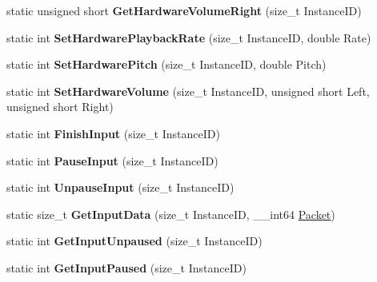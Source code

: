 \begin{DoxyCompactItemize}
\item 
\hypertarget{structmn_c_l_r_aefc279d14aae4274e6966dcf831cd2f9}{
static unsigned short {\bfseries GetHardwareVolumeRight} (size\_\-t InstanceID)}
\label{structmn_c_l_r_aefc279d14aae4274e6966dcf831cd2f9}

\item 
\hypertarget{structmn_c_l_r_a3d8c4243968b7a1a304da2836f5d11ca}{
static int {\bfseries SetHardwarePlaybackRate} (size\_\-t InstanceID, double Rate)}
\label{structmn_c_l_r_a3d8c4243968b7a1a304da2836f5d11ca}

\item 
\hypertarget{structmn_c_l_r_a2242f3936945d511199b5157a4c44e1f}{
static int {\bfseries SetHardwarePitch} (size\_\-t InstanceID, double Pitch)}
\label{structmn_c_l_r_a2242f3936945d511199b5157a4c44e1f}

\item 
\hypertarget{structmn_c_l_r_a3d12528048eb561b05bfba548a473e41}{
static int {\bfseries SetHardwareVolume} (size\_\-t InstanceID, unsigned short Left, unsigned short Right)}
\label{structmn_c_l_r_a3d12528048eb561b05bfba548a473e41}

\item 
\hypertarget{structmn_c_l_r_aa6b7f47ec4530a1a28963daa41a35ef5}{
static int {\bfseries FinishInput} (size\_\-t InstanceID)}
\label{structmn_c_l_r_aa6b7f47ec4530a1a28963daa41a35ef5}

\item 
\hypertarget{structmn_c_l_r_a956ea5c9bd2e0b4334f1159abe274018}{
static int {\bfseries PauseInput} (size\_\-t InstanceID)}
\label{structmn_c_l_r_a956ea5c9bd2e0b4334f1159abe274018}

\item 
\hypertarget{structmn_c_l_r_ae9351eb0a0458a37a201954488d0139d}{
static int {\bfseries UnpauseInput} (size\_\-t InstanceID)}
\label{structmn_c_l_r_ae9351eb0a0458a37a201954488d0139d}

\item 
\hypertarget{structmn_c_l_r_a7fdfa399c9858a2bda956e0c080d612e}{
static size\_\-t {\bfseries GetInputData} (size\_\-t InstanceID, \_\-\_\-int64 \hyperlink{class_packet}{Packet})}
\label{structmn_c_l_r_a7fdfa399c9858a2bda956e0c080d612e}

\item 
\hypertarget{structmn_c_l_r_acb7411784714aad41cc51706d4ba8a1e}{
static int {\bfseries GetInputUnpaused} (size\_\-t InstanceID)}
\label{structmn_c_l_r_acb7411784714aad41cc51706d4ba8a1e}

\item 
\hypertarget{structmn_c_l_r_a90be28c4edb0b11af403ecfe6f3e89b4}{
static int {\bfseries GetInputPaused} (size\_\-t InstanceID)}
\label{structmn_c_l_r_a90be28c4edb0b11af403ecfe6f3e89b4}


\end{DoxyCompactItemize}
